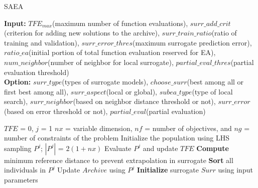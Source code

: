 \begin{algorithm}[!ht]\footnotesize
	\caption{SAEA}
	\textbf{Input:} $TFE_{max}$\hspace{1mm}(maximum number of function evaluations), $surr\_add\_crit$\hspace{1mm}(criterion for adding new solutions to the archive), $surr\_train\_ratio$\hspace{1mm}(ratio of training and validation), $surr\_error\_thres$\hspace{1mm}(maximum surrogate prediction error), $ratio\_ea$\hspace{1mm}(initial portion of total function evaluation reserved for EA), $num\_neighbor$\hspace{1mm}(number of neighbor for local surrogate), $partial\_eval\_thres$\hspace{1mm}(partial evaluation threshold) \\
	\textbf{Option:} $surr\_type$\hspace{1mm}(types of surrogate models), $choose\_surr$\hspace{1mm}(best among all or first best among all), $surr\_aspect$\hspace{1mm}(local or global), $subea\_type$\hspace{1mm}(type of local search), $surr\_neighbor$\hspace{1mm}(based on neighbor distance threshold or not), $surr\_error$\hspace{1mm}(based on error threshold or not), $partial\_eval$\hspace{1mm}(partial evaluation) \\
	\begin{algorithmic}[1]
		\STATE $TFE$ = 0, $j$ = 1
		\STATE $nx$ = variable dimension, $nf$ = number of objectives, and $ng$ = number of constraints of the problem
		\STATE Initialize the population using LHS sampling $P^j$; $\left|P^j\right|$ = $2(1 + nx)$
		\STATE Evaluate $P^j$ and update $TFE$
		\STATE \textbf{Compute} minimum reference distance to prevent extrapolation in surrogate
		\STATE \textbf{Sort} all individuals in $P^j$
		\STATE Update $Archive$ using $P^j$
		\STATE \textbf{Initialize} surrogate $Surr$ using input parameters
		

\end{algorithmic}
\end{algorithm}
